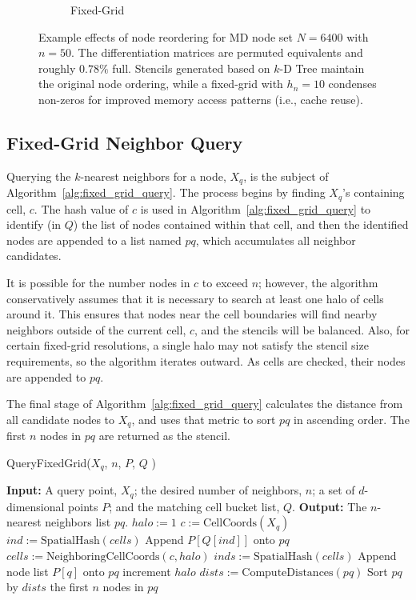 \documentclass{report}
\begin{document}
\begin{figure}
\begin{subfigure}{0.425\textwidth}
\caption{Fixed-Grid}
\end{subfigure}
\caption{Example effects of node reordering for MD node set $N=6400$ with $n=50$. The differentiation matrices are permuted equivalents and roughly $0.78\%$ full. Stencils generated based on $k$-D Tree maintain the original node ordering, while a fixed-grid with $h_n=10$ condenses non-zeros for improved memory access patterns (i.e., cache reuse).}
\label{fig:reorder_example}
\end{figure} 

\subsection{Fixed-Grid Neighbor Query}

Querying the $k$-nearest neighbors for a node, $X_q$, is the subject of Algorithm~\ref{alg:fixed_grid_query}. The process begins by finding $X_q$'s containing cell, $c$. The hash value of $c$ is used in Algorithm~\ref{alg:fixed_grid_query} to identify (in $Q$) the list of nodes contained within that cell, and then the identified nodes are appended to a list named $pq$, which accumulates all neighbor candidates. 

It is possible for the number nodes in $c$ to exceed $n$; however, the algorithm conservatively assumes that it is necessary to search at least one halo of cells around it.  This ensures that nodes near the cell boundaries will find nearby neighbors outside of the current cell, $c$, and the stencils will be balanced. Also, for certain fixed-grid resolutions, a single halo may not satisfy the stencil size requirements, so the algorithm iterates outward. As cells are checked, their nodes are appended to $pq$. 

The final stage of Algorithm~\ref{alg:fixed_grid_query} calculates the distance from all candidate nodes to $X_q$, and uses that metric to sort $pq$ in ascending order. The first $n$ nodes in $pq$ are returned as the stencil. 
\begin{algorithm} 
\caption{QueryFixedGrid($X_q$, $n$, $P$, $Q$ )}         
\label{alg:fixed_grid_query}  
\begin{algorithmic}[1]    
    \State \textbf{Input:} A query point, $X_q$; the desired number of neighbors, $n$; a set of $d$-dimensional points $P$; and the matching cell bucket list, $Q$.
    \State \textbf{Output:} The $n$-nearest neighbors list $pq$.
    \State     
    \State $halo := 1$
    \State $c := \text{CellCoords}(X_q)$ 
    \State $ind := \text{SpatialHash}(cells)$
    \State Append $P[Q[ind]]$ onto $pq$
        \State $cells := \text{NeighboringCellCoords}(c, halo)$
        \State $inds := \text{SpatialHash}(cells)$
            \State Append node list $P[q]$ onto $pq$
            \EndIf
        \EndFor
        \State increment $halo$
    \EndWhile
    \State $dists := \text{ComputeDistances}(pq)$
    \State Sort $pq$ by $dists$
    \State \Return the first $n$ nodes in $pq$
    \end{algorithmic}
\end{algorithm}
\end{document}
